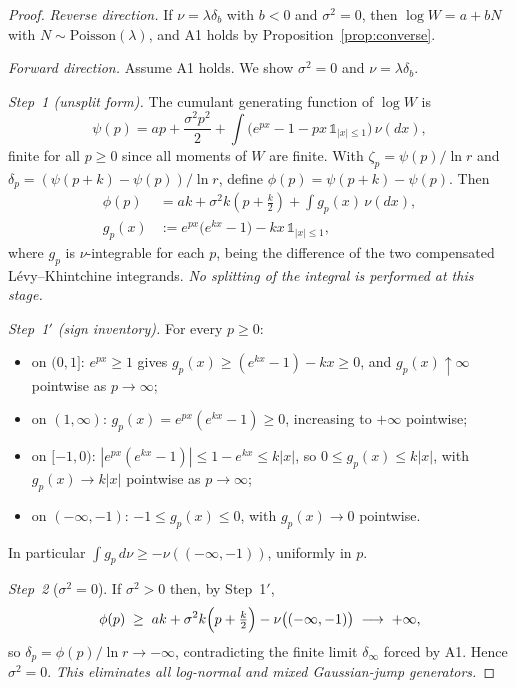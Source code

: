 \documentclass[10pt,a4paper]{amsart}
\begin{document}
\begin{proof}
\textit{Reverse direction.} If $\nu = \lambda\delta_b$ with $b < 0$
and $\sigma^2 = 0$, then $\log W = a + bN$ with $N \sim
\mathrm{Poisson}(\lambda)$, and A1 holds by
Proposition~\ref{prop:converse}.

\textit{Forward direction.}  Assume A1 holds.  We show $\sigma^2 = 0$
and $\nu = \lambda\delta_b$.

\textit{Step~1 (unsplit form).}  The cumulant generating function of
$\log W$ is
\[
  \psi(p) = ap + \frac{\sigma^2 p^2}{2}
  + \int\bigl(e^{px} - 1 - px\,\mathds{1}_{|x|\leq 1}\bigr)
  \,\nu(dx),
\]
finite for all $p \ge 0$ since all moments of $W$ are finite.  With
$\zeta_p = \psi(p)/\ln r$ and $\delta_p = (\psi(p+k) -
\psi(p))/\ln r$, define $\phi(p) = \psi(p+k) - \psi(p)$.  Then
\[
\begin{aligned}
  \phi(p) &= ak + \sigma^2 k\!\left(p + \tfrac{k}{2}\right)
  + \int g_p(x)\,\nu(dx),\\
  g_p(x) &:= e^{px}\bigl(e^{kx}-1\bigr) - kx\,\mathds{1}_{|x|\leq 1},
\end{aligned}
\]
where $g_p$ is $\nu$-integrable for each $p$, being the difference of
the two compensated L\'evy--Khintchine integrands.  \emph{No
splitting of the integral is performed at this stage.}

\textit{Step~1$'$ (sign inventory).}  For every $p \ge 0$:
\begin{itemize}
\item on $(0,1]$: $e^{px} \ge 1$ gives $g_p(x) \ge (e^{kx}-1) - kx
  \ge 0$, and $g_p(x) \uparrow \infty$ pointwise as $p \to \infty$;
\item on $(1,\infty)$: $g_p(x) = e^{px}(e^{kx}-1) \ge 0$, increasing
  to $+\infty$ pointwise;
\item on $[-1,0)$: $|e^{px}(e^{kx}-1)| \le 1 - e^{kx} \le k|x|$, so
  $0 \le g_p(x) \le k|x|$, with $g_p(x) \to k|x|$ pointwise as
  $p \to \infty$;
\item on $(-\infty,-1)$: $-1 \le g_p(x) \le 0$, with $g_p(x) \to 0$
  pointwise.
\end{itemize}
In particular $\int g_p\,d\nu \ge -\nu((-\infty,-1))$, uniformly in
$p$.

\textit{Step~2} ($\sigma^2 = 0$).  If $\sigma^2 > 0$ then, by
Step~1$'$,
\[
  \phi(p) \;\ge\; ak + \sigma^2 k\Bigl(p + \tfrac{k}{2}\Bigr)
  - \nu\bigl((-\infty,-1)\bigr) \;\longrightarrow\; +\infty,
\]
so $\delta_p = \phi(p)/\ln r \to -\infty$, contradicting the finite
limit $\delta_\infty$ forced by A1.  Hence $\sigma^2 = 0$.
\textit{This eliminates all log-normal and mixed Gaussian-jump
generators.}


\end{proof}
\end{document}

